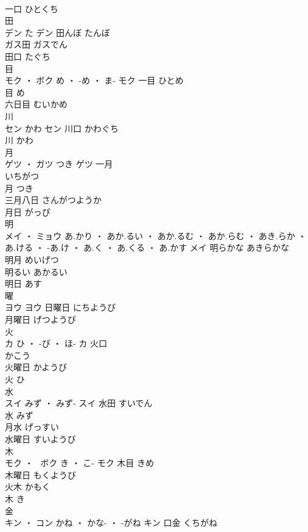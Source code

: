 \documentclass[8pt]{extreport}
\begin{document}
\begin{CJK}{UTF8}{min}
\\	一口	ひとくち	
\\	田	
\\	デン	た	デン	田んぼ	たんぼ	
\\	ガス田	ガスでん	
\\	田口	たぐち	
\\	目	
\\	モク ・ ボク	め ・ -め ・ ま-	モク	一目	ひとめ	
\\	目	め	
\\	六日目	むいかめ	
\\	川	
\\	セン	かわ	セン	川口	かわぐち	
\\	川	かわ	
\\	月	
\\	ゲツ ・ ガツ	つき	ゲツ	一月 
\\	いちがつ	
\\	月	つき	
\\	三月八日	さんがつようか	
\\	月日	がっぴ	
\\	明	
\\	メイ ・ ミョウ	あ.かり ・ あか.るい ・ あか.るむ ・ あか.らむ ・ あき.らか ・ あ.ける ・ -あ.け ・ あ.く ・ あ.くる ・ あ.かす	メイ	明らかな	あきらかな	
\\	明月	めいげつ	
\\	明るい	あかるい	
\\	明日	あす	
\\	曜	
\\	ヨウ		ヨウ	日曜日	にちようび	
\\	月曜日	げつようび	
\\	火	
\\	カ	ひ ・ -び ・ ほ-	カ	火口 
\\	かこう	
\\	火曜日	かようび	
\\	火	ひ	
\\	水	
\\	スイ	みず ・ みず-	スイ	水田	すいでん	
\\	水	みず	
\\	月水	げっすい	
\\	水曜日	すいようび	
\\	木	
\\	モク ・  ボク	き ・ こ-	モク	木目	きめ	
\\	木曜日	もくようび	
\\	火木	かもく	
\\	木	き	
\\	金	
\\	キン ・ コン	かね ・ かな- ・ -がね	キン	口金	くちがね	

\end{CJK}
\end{document}
